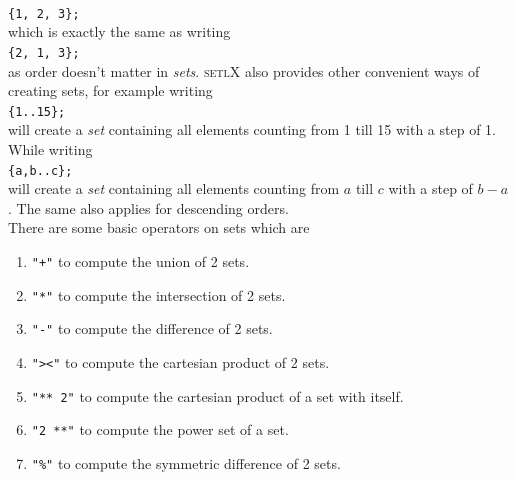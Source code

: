 \documentclass[11pt]{report}
\begin{document}
\\[0.2cm]
\hspace*{1.3cm}
\texttt{\{1, 2, 3\};}
\\[0.2cm]
which is exactly the same as writing
\\[0.2cm]
\hspace*{1.3cm}
\texttt{\{2, 1, 3\};}
\\[0.2cm]
as order doesn't matter in \textsl{sets}. \textsc{setlX} also provides other convenient ways of creating sets, for example writing
\\[0.2cm]
\hspace*{1.3cm}
\texttt{\{1..15\};}
\\[0.2cm]
will create a \textsl{set} containing all elements counting from 1 till 15 with a step of 1. While writing
\\[0.2cm]
\hspace*{1.3cm}
\texttt{\{a,b..c\};}
\\[0.2cm]
will create a \textsl{set} containing all elements counting from $a$ till $c$ with a step of $b-a$. The same also applies for descending orders.
\\
There are some basic operators on sets which are
\begin{enumerate}
\item \texttt{"+"} to compute the union of 2 sets.
\item \texttt{"*"} to compute the intersection of 2 sets.
\item \texttt{"-"} to compute the difference of 2 sets.
\item \texttt{"><"} to compute the cartesian product of 2 sets.
\item \texttt{"** 2"} to compute the cartesian product of a set with itself.
\item \texttt{"2 **"} to compute the power set of a set.
\item \texttt{"\%"} to compute the symmetric difference of 2 sets.
\end{enumerate}
\end{document}
